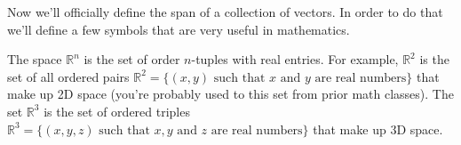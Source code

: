 Now we'll officially define the span of a collection of vectors.  In order to do that
we'll define a few symbols that are very useful in mathematics.
\begin{definition}
    The space $\mathbb{R}^n$ is the set of order $n$-tuples with real entries.  For example, $\mathbb{R}^2$
    is the set of all ordered pairs $\mathbb{R}^2 = \{(x,y) \text{ such that } x \text{ and
    } y \text{ are real numbers}\}$ that make up 2D space
    (you're probably used to this set from
    prior math classes).  The set $\mathbb{R}^3$ is the set of ordered triples
    $\mathbb{R}^3 = \{(x,y,z) \text{ such that } x,y \text{ and
    } z \text{ are real numbers}\}$ that make up 3D space.
\end{definition}


